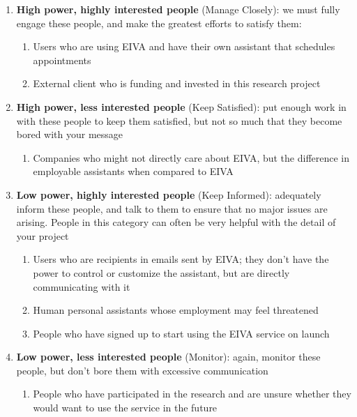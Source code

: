 \documentclass{article}
\begin{document}
\begin{enumerate}
	\item \textbf{High power, highly interested people} (Manage Closely): we must fully engage these people, and make the greatest efforts to satisfy them:
	      \begin{enumerate}
	      	\item Users who are using EIVA and have their own assistant that schedules appointments
	      	\item External client who is funding and invested in this research project
	      \end{enumerate}
	\item \textbf{High power, less interested people} (Keep Satisfied): put enough work in with these people to keep them satisfied, but not so much that they become bored with your message
	      \begin{enumerate}
	      	\item Companies who might not directly care about EIVA, but the difference in employable assistants when compared to EIVA
	      \end{enumerate}
	\item \textbf{Low power, highly interested people} (Keep Informed): adequately inform these people, and talk to them to ensure that no major issues are arising. People in this category can often be very helpful with the detail of your project
	      \begin{enumerate}
	      	\item Users who are recipients in emails sent by EIVA; they don't have the power to control or customize the assistant, but are directly communicating with it
	      	\item Human personal assistants whose employment may feel threatened
	      	\item People who have signed up to start using the EIVA service on launch
	      \end{enumerate}
	\item \textbf{Low power, less interested people} (Monitor): again, monitor these people, but don’t bore them with excessive communication
	      \begin{enumerate}
	      	\item People who have participated in the research and are unsure whether they would want to use the service in the future
	      \end{enumerate}
\end{enumerate}
\end{document}
